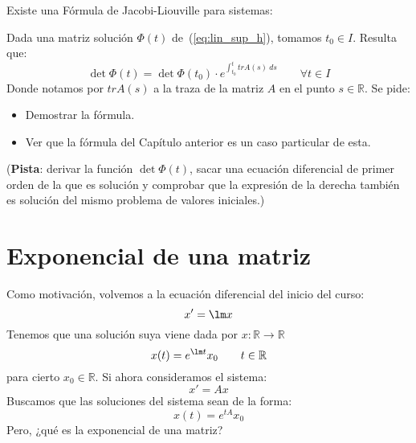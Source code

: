 \begin{ejercicio*}
    Existe una Fórmula de Jacobi-Liouville para sistemas:

    Dada una matriz solución $\Phi(t)$ de~(\ref{eq:lin_sup_h}), tomamos $t_0\in I$. Resulta que:
    \begin{equation*}
        \det\Phi(t) = \det\Phi(t_0)\cdot e^{\displaystyle \int_{t_0}^{t} tr A(s)~ds } \qquad \forall t\in I
    \end{equation*}
    Donde notamos por $trA(s)$ a la traza de la matriz $A$ en el punto $s\in \mathbb{R}$. Se pide:
    \begin{itemize}
        \item Demostrar la fórmula.
        \item Ver que la fórmula del Capítulo anterior es un caso particular de esta.
    \end{itemize}
    (\textbf{Pista}: derivar la función $\det\Phi(t)$, sacar una ecuación diferencial de primer orden de la que es solución y comprobar que la expresión de la derecha también es solución del mismo problema de valores iniciales.)
\end{ejercicio*}

\section{Exponencial de una matriz}
Como motivación, volvemos a la ecuación diferencial del inicio del curso:
\begin{equation*}
    x' = \lm x
\end{equation*}
Tenemos que una solución suya viene dada por $x:\mathbb{R}\rightarrow\mathbb{R}$
\begin{equation*}
    x(t) = e^{\lm t} x_0 \qquad t\in \mathbb{R}
\end{equation*}
para cierto $x_0\in \mathbb{R}$. Si ahora consideramos el sistema:
\begin{equation*}
    x' = Ax
\end{equation*}
Buscamos que las soluciones del sistema sean de la forma:
\begin{equation*}
    x(t) = e^{tA} x_0
\end{equation*}
Pero, ¿qué es la exponencial de una matriz?\\


